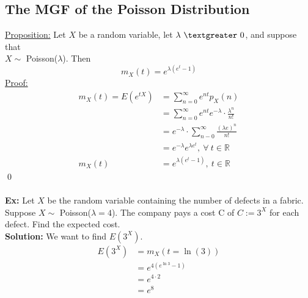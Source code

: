 \documentclass{article}
\newcommand{\R}{\mathbb{R}}
\newcommand{\la}{\lambda}
\newcommand{\gt}{\textgreater}
\newcommand{\x}{\cdot}
\begin{document}
\subsection{The MGF of the Poisson Distribution}
\underline{Proposition:} Let $X$ be a random variable, let $\la\ \gt\ 0$, and suppose that\\ $X \sim$ Poisson($\la$). Then
\[m_{X}(t) = e^{\la(e^{t}-1)}\]
\underline{Proof:}
\begin{align*}
	m_{X}(t) = E(e^{tX}) &= \sum_{n=0}^{\infty} e^{nt}p_{X}(n)\\
					&= \sum_{n=0}^{\infty} e^{nt}e^{-\la}\x \frac{\la^{n}}{n!}\\
					&= e^{-\la}\x \sum_{n-0}^{\infty}\frac{(\la e)^{n}}{n!}\\
					&= e^{-\la}e^{\la e^{t}},\ \forall\ t \in \R\\
			m_{X}(t) &= e^{\la(e^{t}-1)},\ t \in \R
\end{align*}
\qed\\\\
\textbf{Ex:} Let $X$ be the random variable containing the number of defects in a fabric. Suppose $X \sim$ Poisson($\la=4$). The company pays a cost C of $C := 3^{X}$ for each defect. Find the expected cost.\\
\textbf{Solution:} We want to find $E(3^{X})$.
\begin{align*}
	E(3^{X}) &= m_{X}(t=\ln(3))\\
			&= e^{4(e^{\ln{3}}-1)}\\
			&= e^{4\x 2}\\
			&= e^{8}
\end{align*}
\end{document}
